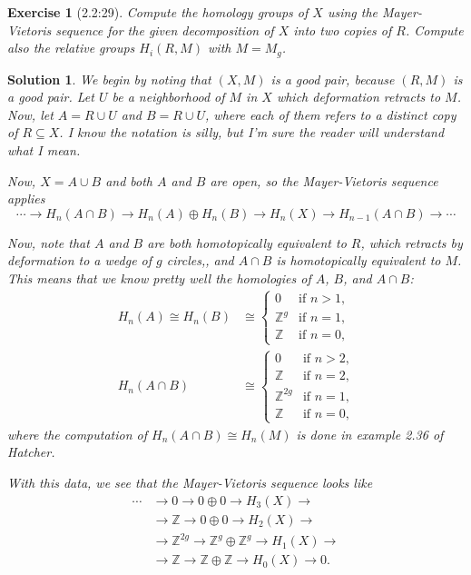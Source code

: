 \documentclass{article}
\theoremstyle{plain}
\newtheorem*{ex}{Exercise}
\theoremstyle{nonumberplain}
\newtheorem{sol}{Solution}
\newcommand{\Z}{\mathbb{Z}}
\begin{document}
\begin{ex}[2.2:29]
Compute the homology groups of $X$ using the Mayer-Vietoris sequence for the given decomposition of $X$ into two copies of $R$. Compute also the relative groups $H_i(R,M)$ with $M = M_g$.
\end{ex}

\begin{sol}
We begin by noting that $(X,M)$ is a good pair, because $(R, M)$ is a good pair. Let $U$ be a neighborhood of $M$ in $X$ which deformation retracts to $M$. Now, let $A = R \cup U$ and $B = R \cup U$, where each of them refers to a distinct copy of $R \subseteq X$. I know the notation is silly, but I'm sure the reader will understand what I mean.

Now, $X = A \cup B$ and both $A$ and $B$ are open, so the Mayer-Vietoris sequence applies
\begin{equation}
\cdots \to H_n(A \cap B) \to H_n(A) \oplus H_n(B) \to H_n(X) \to H_{n-1}(A \cap B) \to \cdots
\end{equation}

Now, note that $A$ and $B$ are both homotopically equivalent to $R$, which retracts by deformation to a wedge of $g$ circles,, and $A \cap B$ is homotopically equivalent to $M$. This means that we know pretty well the homologies of $A$, $B$, and $A \cap B$:
\begin{equation}
\begin{aligned}
H_n(A) \cong H_n(B) &\cong \begin{cases}
0 & \text{if $n > 1$,}\\
\Z^g & \text{if $n = 1$,}\\
\Z & \text{if $n = 0$,}
\end{cases}\\
H_n(A \cap B) &\cong \begin{cases}
0 & \text{if $n > 2$,}\\
\Z & \text{if $n = 2$,}\\
\Z^{2g} & \text{if $n = 1$,}\\
\Z & \text{if $n = 0$,}
\end{cases}
\end{aligned}
\end{equation}
where the computation of $H_n(A \cap B) \cong H_n(M)$ is done in example 2.36 of Hatcher.

With this data, we see that the Mayer-Vietoris sequence looks like
\begin{equation}
\begin{aligned}
\cdots &\to 0 \to 0 \oplus 0 \to H_3(X) \to \\
&\to \Z \to 0 \oplus 0 \to H_2(X) \to\\
&\to \Z^{2g} \to \Z^{g} \oplus \Z^{g} \to H_1(X) \to\\
&\to \Z \to \Z \oplus \Z \to H_0(X) \to 0.
\end{aligned}
\end{equation}


\end{sol}
\end{document}
